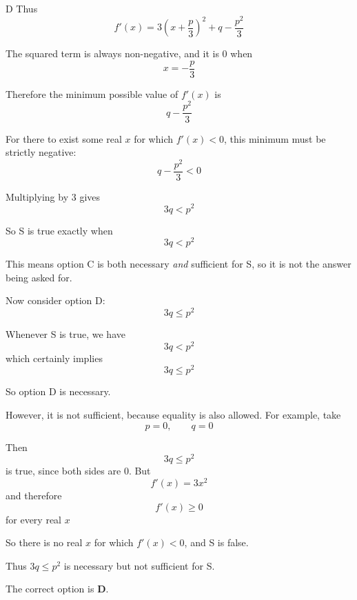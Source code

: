 \documentclass[11pt,a4paper]{article}
\begin{document}
\begin{enumerate}[label=\textbf{\arabic*.},leftmargin=*,itemsep=0pt,start=18]
\begin{djsSolution}{D}
Thus
\[
f'(x)
=
3\left(x+\frac{p}{3}\right)^2
+
q-\frac{p^2}{3}
\]

The squared term is always non-negative, and it is \(0\) when
\[
x=-\frac{p}{3}
\]

Therefore the minimum possible value of \(f'(x)\) is
\[
q-\frac{p^2}{3}
\]

For there to exist some real \(x\) for which \(f'(x)<0\), this minimum must be strictly negative:
\[
q-\frac{p^2}{3}<0
\]

Multiplying by \(3\) gives
\[
3q<p^2
\]

So S is true exactly when
\[
3q<p^2
\]

This means option C is both necessary \emph{and} sufficient for S, so it is not the answer being asked for.

Now consider option D:
\[
3q\leq p^2
\]

Whenever S is true, we have
\[
3q<p^2
\]
which certainly implies
\[
3q\leq p^2
\]

So option D is necessary.

However, it is not sufficient, because equality is also allowed. For example, take
\[
p=0,\qquad q=0
\]

Then
\[
3q\leq p^2
\]
is true, since both sides are \(0\). But
\[
f'(x)=3x^2
\]
and therefore
\[
f'(x)\geq0
\]
for every real \(x\)

So there is no real \(x\) for which \(f'(x)<0\), and S is false.

Thus \(3q\leq p^2\) is necessary but not sufficient for S.

The correct option is \textbf{D}.
\end{djsSolution}
\end{enumerate}
\clearpage
\thispagestyle{djssolutions}
\vspace*{8pt}
\end{document}
